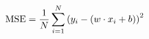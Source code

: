\documentclass[preview]{standalone}
\begin{document}
\begin{align*}
\special{dvisvgm:raw <g id='unique000'>}\text{MSE} = \frac{1}{N} \sum_{i=1}^N \left( y_i - (w \cdot x_i + b) \right)^2\special{dvisvgm:raw </g>}
\end{align*}
\end{document}
